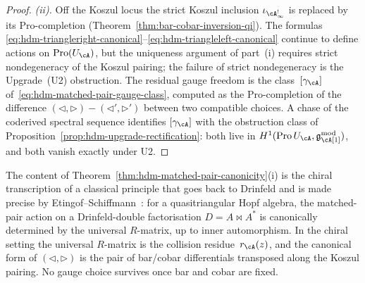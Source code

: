 \begin{proof}
\emph{(ii).} Off the Koszul locus the strict Koszul inclusion
$\iota_{\cA^!_\infty}$ is replaced by its
$\mathrm{Pro}$-completion (Theorem~\ref{thm:bar-cobar-inversion-qi}).
The formulas
\eqref{eq:hdm-triangleright-canonical}--\eqref{eq:hdm-triangleleft-canonical}
continue to define actions on $\mathrm{Pro}(U_\cA)$, but the
uniqueness argument of part~(i) requires strict nondegeneracy of the
Koszul pairing; the failure of strict nondegeneracy is the
Upgrade~(U2) obstruction. The residual gauge freedom is the
class~$[\gamma_\cA]$ of~\eqref{eq:hdm-matched-pair-gauge-class},
computed as the
$\mathrm{Pro}$-completion of the difference
$(\triangleleft,\triangleright)-
(\triangleleft',\triangleright')$ between two compatible choices. A
chase of the coderived spectral sequence identifies $[\gamma_\cA]$
with the obstruction class of
Proposition~\ref{prop:hdm-upgrade-rectification}: both live in
$H^1(\mathrm{Pro}\,U_\cA,\mathfrak g^{\mathrm{mod}}_\cA[1])$, and
both vanish exactly under U2.
\end{proof}

\begin{remark}
\label{rem:hdm-matched-pair-etingof-schiffmann}
The content of
Theorem~\ref{thm:hdm-matched-pair-canonicity}(i) is the chiral
transcription of a classical principle that goes back to Drinfeld and
is made precise by Etingof--Schiffmann~\cite{EtingofSchiffmann}: for
a quasitriangular Hopf algebra, the matched-pair action on a
Drinfeld-double factorisation
$D=A\bowtie A^*$ is canonically determined by the universal
$R$-matrix, up to inner automorphism. In the chiral setting the
universal $R$-matrix is the collision residue~$r_\cA(z)$, and the
canonical form of $(\triangleleft,\triangleright)$ is the pair of
bar/cobar differentials transposed along the Koszul pairing. No gauge
choice survives once bar and cobar are fixed.
\end{remark}

